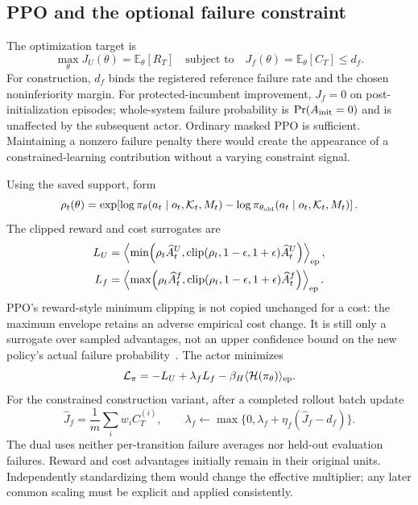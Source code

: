 \documentclass[11pt,a4paper]{article}
\newcommand{\E}{\mathbb{E}}
\theoremstyle{definition}\newtheorem{definition}[proposition]{Definition}
\begin{document}
\subsection{PPO and the optional failure constraint}

The optimization target is
\begin{equation}
 \max_\theta J_U(\theta)=\E_\theta[R_T]
 \quad\text{subject to}\quad
 J_f(\theta)=\E_\theta[C_T]\le d_f.
 \label{eq:rl-cmdp}
\end{equation}
For construction, \(d_f\) binds the registered reference failure rate and the chosen
noninferiority margin. For protected-incumbent improvement, \(J_f=0\) on post-initialization episodes; whole-system failure probability is $\Pr(A_{\rm init}=0)$ and is unaffected by the subsequent actor. Ordinary
masked PPO is sufficient. Maintaining a nonzero failure penalty there would create the appearance
of a constrained-learning contribution without a varying constraint signal.

Using the saved support, form
\begin{equation}
 \rho_t(\theta)=\exp\!\left[
 \log\pi_\theta(a_t\mid o_t,\mathcal K_t,M_t)-
 \log\pi_{\theta_{\rm old}}(a_t\mid o_t,\mathcal K_t,M_t)\right].
\end{equation}
The clipped reward and cost surrogates are
\begin{align}
 L_U&=\left\langle\min\!\left(
 \rho_t\widehat A_t^U,
 \operatorname{clip}(\rho_t,1-\epsilon,1+\epsilon)\widehat A_t^U
 \right)\right\rangle_{\rm ep},\\
 L_f&=\left\langle\max\!\left(
 \rho_t\widehat A_t^f,
 \operatorname{clip}(\rho_t,1-\epsilon,1+\epsilon)\widehat A_t^f
 \right)\right\rangle_{\rm ep}.
 \label{eq:rl-ppo-surrogates}
\end{align}
PPO's reward-style minimum clipping is not copied unchanged for a cost: the maximum envelope
retains an adverse empirical cost change. It is still only a surrogate over sampled advantages,
not an upper confidence bound on the new policy's actual failure probability~\cite{ppo2017}.
The actor minimizes
\begin{equation}
 \mathcal L_\pi=-L_U+\lambda_fL_f-\beta_H\langle\mathcal H(\pi_\theta)\rangle_{\rm ep}.
 \label{eq:rl-actor-loss}
\end{equation}
For the constrained construction variant, after a completed rollout batch update
\begin{equation}
 \widehat J_f=\frac1m\sum_iw_iC_T^{(i)},\qquad
 \lambda_f\leftarrow\max\{0,\lambda_f+\eta_f(\widehat J_f-d_f)\}.
 \label{eq:rl-dual}
\end{equation}
The dual uses neither per-transition failure averages nor held-out evaluation failures. Reward and
cost advantages initially remain in their original units. Independently standardizing them would
change the effective multiplier; any later common scaling must be explicit and applied consistently.
\end{document}
